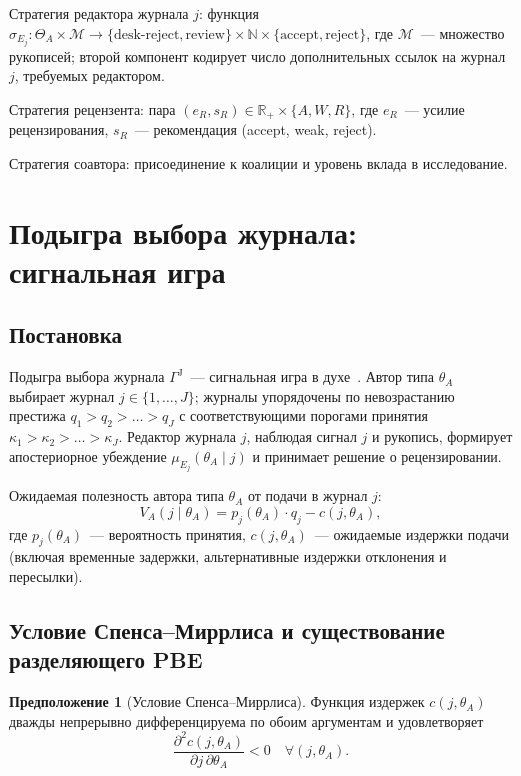 \documentclass[12pt,a4paper]{article}
\theoremstyle{definition}
\newtheorem{assumption}{Предположение}
\newcommand{\R}{\mathbb{R}}
\newcommand{\N}{\mathbb{N}}
\begin{document}
Стратегия редактора журнала $j$: функция $\sigma_{E_j}\colon \Theta_A
\times \mathcal{M} \to \{\text{desk-reject}, \text{review}\} \times
\N \times \{\text{accept}, \text{reject}\}$, где $\mathcal{M}$~---
множество рукописей; второй компонент кодирует число дополнительных
ссылок на журнал $j$, требуемых редактором.

Стратегия рецензента: пара $(e_R, s_R) \in \R_+ \times \{A, W, R\}$,
где $e_R$~--- усилие рецензирования, $s_R$~--- рекомендация (accept,
weak, reject).

Стратегия соавтора: присоединение к коалиции и уровень вклада в исследование.

\section{Подыгра выбора журнала: сигнальная игра}
\label{sec:journal-choice}

\subsection{Постановка}

Подыгра выбора журнала $\Gamma^{\mathrm{J}}$~--- сигнальная игра в
духе~\citep{spence1973}. Автор типа $\theta_A$ выбирает журнал $j \in
\{1, \dots, J\}$; журналы упорядочены по невозрастанию престижа $q_1
> q_2 > \dots > q_J$ с соответствующими порогами принятия $\kappa_1 >
\kappa_2 > \dots > \kappa_J$. Редактор журнала $j$, наблюдая сигнал
$j$ и рукопись, формирует апостериорное убеждение $\mu_{E_j}(\theta_A
\mid j)$ и принимает решение о рецензировании.

Ожидаемая полезность автора типа $\theta_A$ от подачи в журнал $j$:
\begin{equation}
  V_A(j \mid \theta_A) = p_j(\theta_A) \cdot q_j - c(j, \theta_A),
  \label{eq:vA}
\end{equation}
где $p_j(\theta_A)$~--- вероятность принятия, $c(j, \theta_A)$~---
ожидаемые издержки подачи (включая временные задержки, альтернативные
издержки отклонения и пересылки).

\subsection{Условие Спенса--Миррлиса и существование разделяющего PBE}

\begin{assumption}[Условие Спенса--Миррлиса]
  \label{assume:sc}
  Функция издержек $c(j, \theta_A)$ дважды непрерывно дифференцируема
  по обоим аргументам и удовлетворяет
  \begin{equation}
    \frac{\partial^2 c(j, \theta_A)}{\partial j \, \partial \theta_A}
    < 0 \quad \forall (j, \theta_A).
    \label{eq:single-crossing}
  \end{equation}
\end{assumption}
\end{document}
